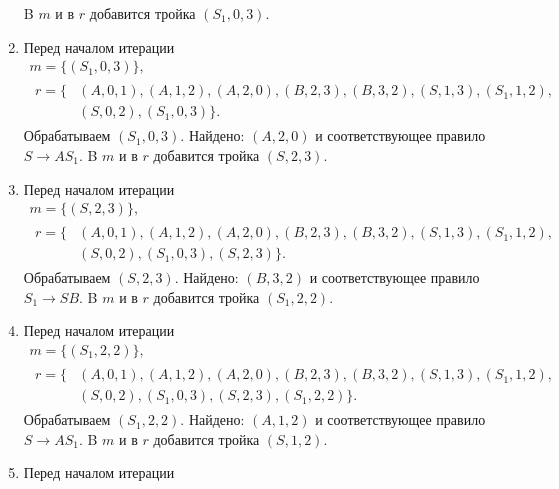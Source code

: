 \begin{example}
\begin{enumerate}
              B $m$ и в $r$ добавится тройка $(S_1, 0, 3)$.
        \item Перед началом итерации
              \begin{gather*}
                  m = \{(S_1, 0, 3)\}, \\
                  \begin{aligned}
                      r = \{ & (A, 0, 1), (A, 1, 2), (A, 2, 0), (B, 2, 3), (B, 3, 2), (S, 1, 3), (S_1, 1, 2), \\
                             & (S, 0, 2), (S_1, 0, 3)\}.
                  \end{aligned}
              \end{gather*}
              Обрабатываем $(S_1, 0, 3)$.
              Найдено: $(A, 2, 0)$ и соответствующее правило $S \to A S_1$.
              B $m$ и в $r$ добавится тройка $(S, 2, 3)$.
        \item Перед началом итерации
              \begin{gather*}
                  m = \{(S, 2, 3)\}, \\
                  \begin{aligned}
                      r = \{ & (A, 0, 1), (A, 1, 2), (A, 2, 0), (B, 2, 3), (B, 3, 2), (S, 1, 3), (S_1, 1, 2), \\
                             & (S, 0, 2), (S_1, 0, 3), (S, 2, 3)\}.
                  \end{aligned}
              \end{gather*}
              Обрабатываем $(S, 2, 3)$.
              Найдено: $(B, 3, 2)$ и соответствующее правило $S_1 \to S B$.
              B $m$ и в $r$ добавится тройка $(S_1, 2, 2)$.
        \item Перед началом итерации
              \begin{gather*}
                  m = \{(S_1, 2, 2)\}, \\
                  \begin{aligned}
                      r = \{ & (A, 0, 1), (A, 1, 2), (A, 2, 0), (B, 2, 3), (B, 3, 2), (S, 1, 3), (S_1, 1, 2), \\
                             & (S, 0, 2), (S_1, 0, 3), (S, 2, 3), (S_1, 2, 2)\}.
                  \end{aligned}
              \end{gather*}
              Обрабатываем $(S_1, 2, 2)$.
              Найдено: $(A, 1, 2)$ и соответствующее правило $S \to A S_1$.
              B $m$ и в $r$ добавится тройка $(S, 1, 2)$.
        \item Перед началом итерации

\end{enumerate}
\end{example}
